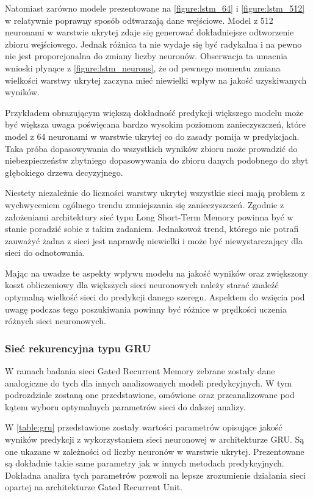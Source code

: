 \documentclass[10pt,a4paper]{article}
\begin{document}
Natomiast zarówno modele prezentowane na \autoref{figure:lstm_64} i \autoref{figure:lstm_512} w relatywnie poprawny sposób odtwarzają dane wejściowe. Model z 512 neuronami w warstwie ukrytej zdaje się generować dokładniejsze odtworzenie zbioru wejściowego. Jednak różnica ta nie wydaje się być radykalna i na pewno nie jest proporcjonalna do zmiany liczby neuronów. Obserwacja ta umacnia wnioski płynące z \autoref{figure:lstm_neurons}, że od pewnego momentu zmiana wielkości warstwy ukrytej zaczyna mieć niewielki wpływ na jakość uzyskiwanych wyników. 

Przykładem obrazującym większą dokładność predykcji większego modelu może być większa uwaga poświęcana bardzo wysokim poziomom zanieczyszczeń, które model z 64 neuronami w warstwie ukrytej co do zasady pomija w predykcjach. Taka próba dopasowywania do wszystkich wyników zbioru może prowadzić do niebezpieczeństw zbytniego dopasowywania do zbioru danych podobnego do zbyt głębokiego drzewa decyzyjnego.

Niestety niezależnie do liczności warstwy ukrytej wszystkie sieci mają problem z wychwyceniem ogólnego trendu zmniejszania się zanieczyszczeń. Zgodnie z założeniami architektury sieć typu Long Short-Term Memory powinna być w stanie poradzić sobie z takim zadaniem. Jednakowoż trend, którego nie potrafi zauważyć żadna z sieci jest naprawdę niewielki i może być niewystarczający dla sieci do odnotowania. 

Mając na uwadze te aspekty wpływu modelu na jakość wyników oraz zwiększony koszt obliczeniowy dla większych sieci neuronowych należy starać znaleźć optymalną wielkość sieci do predykcji danego szeregu. Aspektem do wzięcia pod uwagę podczas tego poszukiwania powinny być różnice w prędkości uczenia różnych sieci neuronowych.

\subsubsection{Sieć rekurencyjna typu GRU}
W ramach badania sieci Gated Recurrent Memory zebrane zostały dane analogiczne do tych dla innych analizowanych modeli predykcyjnych. W tym podrozdziale zostaną one przedstawione, omówione oraz przeanalizowane pod kątem wyboru optymalnych parametrów sieci do dalszej analizy. 

W \autoref{table:gru} przedstawione zostały wartości parametrów opisujące jakość wyników predykcji z wykorzystaniem sieci neuronowej w architekturze GRU. Są one ukazane w zależności od liczby neuronów w warstwie ukrytej. Prezentowane są dokładnie takie same parametry jak w innych metodach predykcyjnych. Dokładna analiza tych parametrów pozwoli na lepsze zrozumienie działania sieci opartej na architekturze Gated Recurrent Unit. 
\end{document}
